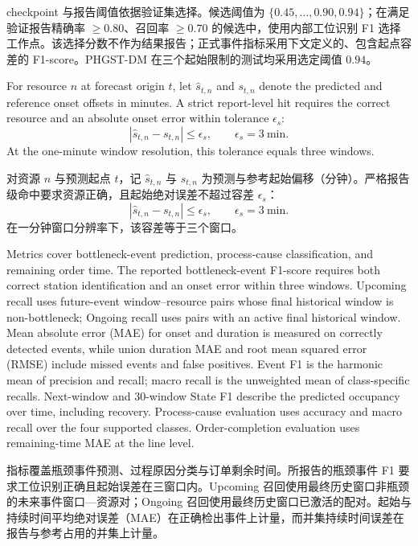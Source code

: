 \documentclass[a4paper,fleqn]{cas-dc}
\newcommand{\zhpara}[1]{%
  \par\begingroup\small\color{black!72}\noindent #1\par\endgroup}
\begin{document}
\zhpara{checkpoint 与报告阈值依据验证集选择。候选阈值为 $\{0.45,\dots,0.90,0.94\}$；在满足验证报告精确率 $\geq0.80$、召回率 $\geq0.70$ 的候选中，使用内部工位识别 F1 选择工作点。该选择分数不作为结果报告；正式事件指标采用下文定义的、包含起点容差的 F1-score。PHGST-DM 在三个起始限制的测试均采用选定阈值 $0.94$。}


For resource $n$ at forecast origin $t$, let $\hat s_{t,n}$ and $s_{t,n}$ denote the predicted and reference onset offsets in minutes. A strict report-level hit requires the correct resource and an absolute onset error within tolerance $\epsilon_s$:
\begin{equation}
|\hat{s}_{t,n}-s_{t,n}|\leq\epsilon_s,\qquad
\epsilon_s=3~\mathrm{min}.
\end{equation}
At the one-minute window resolution, this tolerance equals three windows.

\zhpara{对资源 $n$ 与预测起点 $t$，记 $\hat s_{t,n}$ 与 $s_{t,n}$ 为预测与参考起始偏移（分钟）。严格报告级命中要求资源正确，且起始绝对误差不超过容差 $\epsilon_s$：
\begin{equation}
|\hat{s}_{t,n}-s_{t,n}|\leq\epsilon_s,\qquad
\epsilon_s=3~\mathrm{min}.
\end{equation}
在一分钟窗口分辨率下，该容差等于三个窗口。}


Metrics cover bottleneck-event prediction, process-cause classification, and remaining order time. The reported bottleneck-event F1-score requires both correct station identification and an onset error within three windows. Upcoming recall uses future-event window--resource pairs whose final historical window is non-bottleneck; Ongoing recall uses pairs with an active final historical window. Mean absolute error (MAE) for onset and duration is measured on correctly detected events, while union duration MAE and root mean squared error (RMSE) include missed events and false positives. Event F1 is the harmonic mean of precision and recall; macro recall is the unweighted mean of class-specific recalls. Next-window and 30-window State F1 describe the predicted occupancy over time, including recovery. Process-cause evaluation uses accuracy and macro recall over the four supported classes. Order-completion evaluation uses remaining-time MAE at the line level.

\zhpara{指标覆盖瓶颈事件预测、过程原因分类与订单剩余时间。所报告的瓶颈事件 F1 要求工位识别正确且起始误差在三窗口内。Upcoming 召回使用最终历史窗口非瓶颈的未来事件窗口—资源对；Ongoing 召回使用最终历史窗口已激活的配对。起始与持续时间平均绝对误差（MAE）在正确检出事件上计量，而并集持续时间误差在报告与参考占用的并集上计量。}
\end{document}
